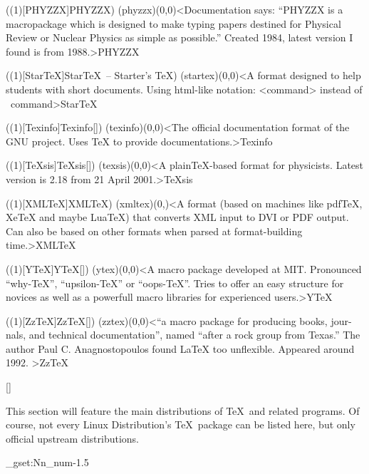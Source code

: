 \tograph(\tostruct(1)[PHYZZX]{PHYZZX}){
	\tonode(phyzzx)(0,0)<Documentation says: “PHYZZX is a macropackage which is designed to make typing papers destined for Physical Review or Nuclear Physics as simple as possible.” Created 1984, latest version I found is from 1988.>{PHYZZX}
}

\tograph(\tostruct(1)[Star\TeX]{Star\TeX\ – Starter's \TeX}){
	\tonode(startex)(0,0)<A format designed to help students with short documents. Using html-like notation: <command> instead of \ command>{Star\TeX}
}

\tograph(\tostruct(1)[Texinfo]{Texinfo}[\normalimportant]){
	\tonode(texinfo)(0,0)<The official documentation format of the GNU project. Uses TeX to provide documentations.>{Texinfo}
}

\tograph(\tostruct(1)[TeXsis]{\TeX sis}[\normalimportant]){
	\tonode(texsis)(0,0)<A plainTeX-based format for physicists. Latest version is 2.18 from 21 April 2001.>{\TeX sis}
}

\tograph(\tostruct(1)[XML\TeX]{XML\TeX}){
  \tonode(xmltex)(0,\layer)<A format (based on machines like pdfTeX, XeTeX and maybe LuaTeX) that converts XML input to DVI or PDF output. Can also be based on other formats when parsed at format-building time.>{XML\TeX}
}

\tograph(\tostruct(1)[Y\TeX]{Y\TeX}[\experimental]){
	\tonode(ytex)(0,0)<A macro package developed at MIT. Pronounced “why-TeX”, “upsilon-TeX” or “oops-TeX”. Tries to offer an easy structure for novices as well as a powerfull macro libraries for experienced users.>{Y\TeX}
}

\tograph(\tostruct(1)[Zz\TeX]{Zz\TeX}[\normalimportant]){
	\tonode(zztex)(0,0)<“a macro package for producing books, jour-
nals, and technical documentation”, named “after a rock group from Texas.” The author Paul C. Anagnostopoulos found LaTeX too unflexible. Appeared around 1992.
>{Zz\TeX}
}

\clearpage

[\distro]
\parbox{\textwidth}{\normalsize
This section will feature the main distributions of \TeX\ and related programs. Of course, not every Linux Distribution's \TeX\ package can be listed here, but only official upstream distributions.
}

\ExplSyntaxOn
\fp_gset:Nn\layerdist_num{-1.5}
\ExplSyntaxOff

